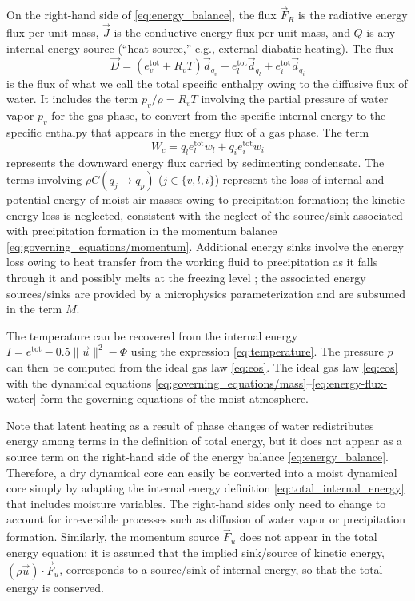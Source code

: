 \documentclass{report}
\begin{document}
On the right-hand side of \eqref{eq:energy_balance}, the flux $\vec{F}_R$ is the radiative energy flux per unit mass, $\vec{J}$ is the conductive energy flux per unit mass, and $Q$ is any internal energy source (``heat source,'' e.g., external diabatic heating). The flux 
\begin{equation}\label{eq:energy-flux-water}
\vec{D} = (e_v^{\mathrm{tot}} + R_v T) \vec{d}_{q_v} + e_l^{\mathrm{tot}} \vec{d}_{q_l} +  e_i^{\mathrm{tot}} \vec{d}_{q_i}
\end{equation}
is the flux of what we call the total specific enthalpy owing to the diffusive flux of water. It includes the term $p_v/\rho = R_v T$ involving the partial pressure of water vapor $p_v$ for the gas phase, to convert from the specific internal energy to the specific enthalpy that appears in the energy flux of a gas phase. The term 
\begin{equation}
W_c = q_l e_l^{\mathrm{tot}} w_l + q_i e_i^{\mathrm{tot}} w_i
\end{equation}
represents the downward energy flux carried by sedimenting condensate. The terms involving $\rho C(q_j \rightarrow q_p)$ ($j \in \{ v, l, i \}$) represent the loss of internal and potential energy of moist air masses owing to precipitation formation; the kinetic energy loss is neglected, consistent with the neglect of the source/sink associated with precipitation formation in the momentum balance \eqref{eq:governing_equations/momentum}. Additional energy sinks involve the energy loss owing to heat transfer from the working fluid to precipitation as it falls through it and possibly melts at the freezing level \citep{Raymond13b}; the associated energy sources/sinks are provided by a microphysics parameterization and are subsumed in the term $M$.

The temperature can be recovered from the internal energy $I = e^{\mathrm{tot}} - 0.5 \| \vec{u} \|^2 - \Phi$ using the expression \eqref{eq:temperature}. The pressure $p$ can then be computed from the ideal gas law \eqref{eq:eos}. The ideal gas law \eqref{eq:eos} with the dynamical equations \eqref{eq:governing_equations/mass}--\eqref{eq:energy-flux-water} form the governing equations of the moist atmosphere.

Note that latent heating as a result of phase changes of water redistributes energy among terms in the definition of total energy, but it does not appear as a source term on the right-hand side of the energy balance \eqref{eq:energy_balance}. Therefore, a dry dynamical core can easily be converted into a moist dynamical core simply by adapting the internal energy definition \eqref{eq:total_internal_energy} that includes moisture variables. The right-hand sides only need to change to account for irreversible processes such as diffusion of water vapor or precipitation formation. Similarly, the momentum source $\vec{F}_u$ does not appear in the total energy equation; it is assumed that the implied sink/source of kinetic energy, $(\rho \vec{u})\cdot \vec{F}_u$, corresponds to a source/sink of internal energy, so that the total energy is conserved.
\end{document}
